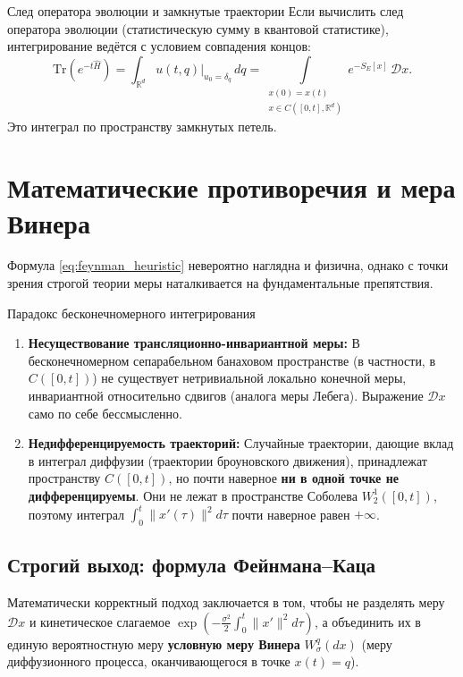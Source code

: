 \documentclass[12pt,a4paper]{article}
\begin{document}
\begin{theorybox}{След оператора эволюции и замкнутые траектории}
Если вычислить след оператора эволюции (статистическую сумму в квантовой статистике), интегрирование ведётся с условием совпадения концов:
\begin{equation}
    \mathrm{Tr}\left( e^{-t\hat{H}} \right) = \int_{\mathbb{R}^d} u(t, q)\big|_{u_0 = \delta_q} \, dq = \int\limits_{\substack{x(0)=x(t) \\ x \in C([0,t], \mathbb{R}^d)}} e^{-S_E[x]} \, \mathcal{D}x.
\end{equation}
Это интеграл по пространству замкнутых петель.
\end{theorybox}



\section{Математические противоречия и мера Винера}

Формула \eqref{eq:feynman_heuristic} невероятно наглядна и физична, однако с точки зрения строгой теории меры наталкивается на фундаментальные препятствия.

\begin{warningbox}{Парадокс бесконечномерного интегрирования}
\begin{enumerate}
    \item \textbf{Несуществование трансляционно-инвариантной меры:} В бесконечномерном сепарабельном банаховом пространстве (в частности, в $C([0, t])$) не существует нетривиальной локально конечной меры, инвариантной относительно сдвигов (аналога меры Лебега). Выражение $\mathcal{D}x$ само по себе бессмысленно.
    \item \textbf{Недифференцируемость траекторий:} Случайные траектории, дающие вклад в интеграл диффузии (траектории броуновского движения), принадлежат пространству $C([0,t])$, но почти наверное \textbf{ни в одной точке не дифференцируемы}. Они не лежат в пространстве Соболева $W_2^1([0,t])$, поэтому интеграл $\int_0^t \|x'(\tau)\|^2 d\tau$ почти наверное равен $+\infty$.
\end{enumerate}
\end{warningbox}

\subsection{Строгий выход: формула Фейнмана--Каца}
Математически корректный подход заключается в том, чтобы не разделять меру $\mathcal{D}x$ и кинетическое слагаемое $\exp\left(-\frac{\sigma^2}{2}\int_0^t \|x'\|^2 d\tau\right)$, а объединить их в единую вероятностную меру  \textbf{условную меру Винера} $W_\sigma^q(dx)$ (меру диффузионного процесса, оканчивающегося в точке $x(t)=q$).
\end{document}
